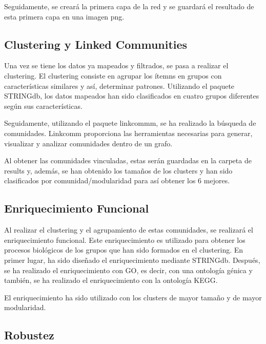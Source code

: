Seguidamente, se creará la primera capa de la red y se guardará el resultado de esta primera capa en una imagen png. 

\subsection{Clustering y Linked Communities}
Una vez se tiene los datos ya mapeados y filtrados, se pasa a realizar el clustering. El clustering consiste en agrupar los ítemns en grupos con características similares y así, determinar patrones.
Utilizando el paquete STRINGdb, los datos mapeados han sido clasificados en cuatro grupos diferentes según sus características.

Seguidamente, utilizando el paquete linkcommm, se ha realizado la búsqueda de comunidades. Linkcomm proporciona las herramientas necesarias para generar, visualizar y analizar comunidades dentro de un grafo.

Al obtener las comunidades vinculadas, estas serán guardadas en la carpeta de results y, además, se han obtenido los tamaños de los clusters y han sido clasificados por comunidad/modularidad para así obtener los 6 mejores.

\subsection{Enriquecimiento Funcional}
Al realizar el clustering y el agrupamiento de estas comunidades, se realizará el enriquecimiento funcional. Este enriquecimiento es utilizado para obtener los procesos biológicos de los grupos que han sido formados en el clustering.
En primer lugar, ha sido diseñado el enriquecimiento mediante STRINGdb. Después, se ha realizado el enriquecimiento con GO, es decir, con una ontología génica y también, se ha realizado el enriquecimiento con la ontología KEGG. 

El enriquecimiento ha sido utilizado con los clusters de mayor tamaño y de mayor modularidad.

\subsection{Robustez}